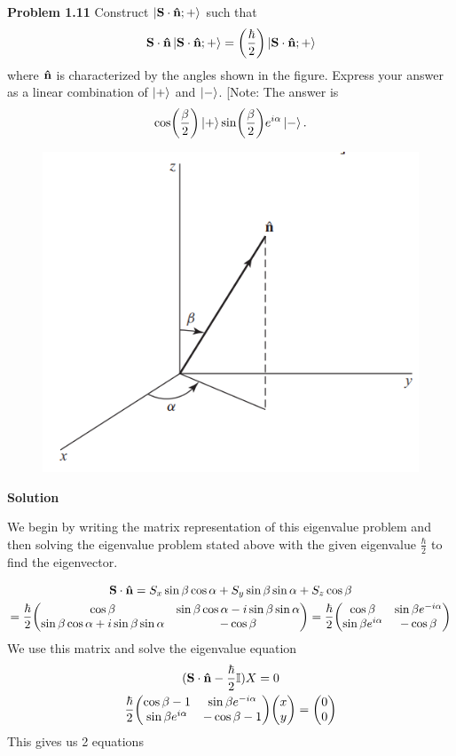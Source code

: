 \item \textbf{Problem 1.11} 
Construct $\ket{\vb S\cdot\vu n;+}$ such that 
\[
\vb S \cdot \vu n \ket{\vb S\cdot\vu n;+} = \qty(\frac{\hbar}{2}) \ket{\vb S\cdot\vu n;+}
\]
where $\vu n$ is characterized by the angles shown in the figure. Express your answer as a
linear combination of $\ket+$ and $\ket -$. [Note: The answer is
\[
\cos(\frac \beta2) \ket + \sin(\frac \beta2) e^{i\alpha}\ket -.
\]
\begin{figure}[h]
    \centering
    \includegraphics[width=0.5\linewidth]{P4.png}
\end{figure}

\textbf{Solution}

We begin by writing the matrix representation of this eigenvalue problem and then solving the eigenvalue problem stated above with the given eigenvalue $\frac{\hbar}{2}$ to find the eigenvector.

\begin{gather*}
\vb S \cdot \vu n = S_x \sin\beta \cos\alpha + S_y \sin\beta\sin\alpha + S_z \cos\beta\\
=\frac\hbar2 \mqty(\cos\beta & \sin\beta\cos\alpha - i\sin\beta\sin\alpha\\ 
                \sin\beta\cos\alpha + i\sin\beta\sin\alpha & -\cos\beta) = \frac\hbar2 \mqty(\cos\beta & \sin\beta e^{-i\alpha} \\ \sin\beta e^{i\alpha} & -\cos\beta)\\
\end{gather*}
We use this matrix and solve the eigenvalue equation 
\begin{gather*}
    (\vb S\cdot \vu n - \frac\hbar2 \mathbb{I}) X = 0\\
    \frac{\hbar}{2} \mqty(\cos\beta -1 & \sin\beta e^{-i\alpha} \\ \sin\beta e^{i\alpha} & -\cos\beta - 1) \mqty(x \\ y) = \mqty(0\\0)\\
\end{gather*}
This gives us 2 equations

